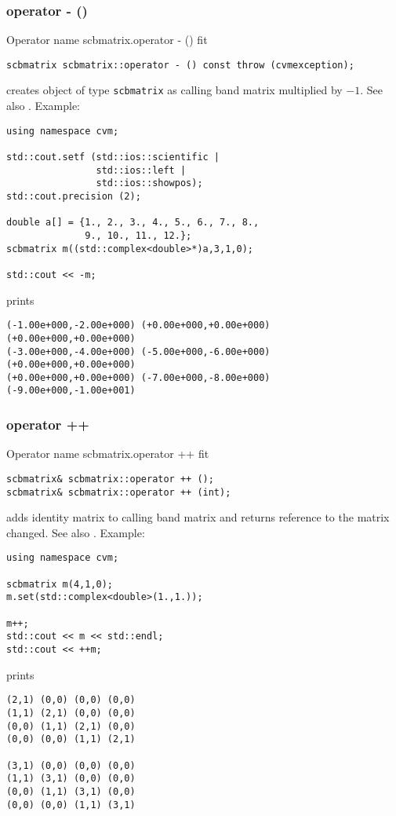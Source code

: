 \subsubsection{operator - ()}
Operator%
\pdfdest name {scbmatrix.operator - ()} fit
\begin{verbatim}
scbmatrix scbmatrix::operator - () const throw (cvmexception);
\end{verbatim}
creates  object of type \verb"scbmatrix" as
 calling band matrix multiplied by $-1$.
See also .
Example:
\begin{Verbatim}
using namespace cvm;

std::cout.setf (std::ios::scientific | 
                std::ios::left | 
                std::ios::showpos); 
std::cout.precision (2);

double a[] = {1., 2., 3., 4., 5., 6., 7., 8.,
              9., 10., 11., 12.};
scbmatrix m((std::complex<double>*)a,3,1,0);

std::cout << -m;
\end{Verbatim}
prints
\begin{Verbatim}
(-1.00e+000,-2.00e+000) (+0.00e+000,+0.00e+000) (+0.00e+000,+0.00e+000)
(-3.00e+000,-4.00e+000) (-5.00e+000,-6.00e+000) (+0.00e+000,+0.00e+000)
(+0.00e+000,+0.00e+000) (-7.00e+000,-8.00e+000) (-9.00e+000,-1.00e+001)
\end{Verbatim}
\newpage



\subsubsection{operator ++}
Operator%
\pdfdest name {scbmatrix.operator ++} fit
\begin{verbatim}
scbmatrix& scbmatrix::operator ++ ();
scbmatrix& scbmatrix::operator ++ (int);
\end{verbatim}
adds identity matrix to  calling band matrix
and returns  reference to
the matrix changed.
See also .
Example:
\begin{Verbatim}
using namespace cvm;

scbmatrix m(4,1,0);
m.set(std::complex<double>(1.,1.));

m++;
std::cout << m << std::endl;
std::cout << ++m;
\end{Verbatim}
prints
\begin{Verbatim}
(2,1) (0,0) (0,0) (0,0)
(1,1) (2,1) (0,0) (0,0)
(0,0) (1,1) (2,1) (0,0)
(0,0) (0,0) (1,1) (2,1)

(3,1) (0,0) (0,0) (0,0)
(1,1) (3,1) (0,0) (0,0)
(0,0) (1,1) (3,1) (0,0)
(0,0) (0,0) (1,1) (3,1)
\end{Verbatim}
\newpage




